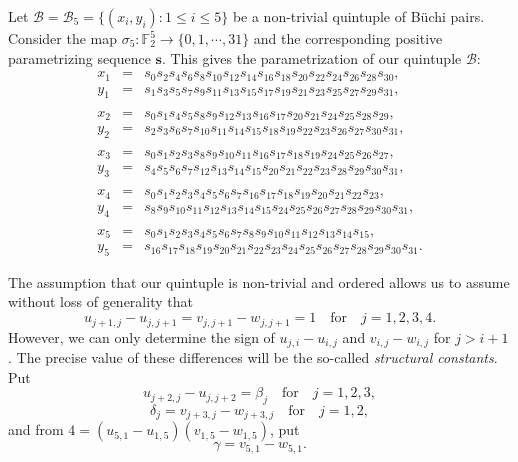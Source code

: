 \documentclass[letterpaper,10pt]{amsart}
\newcommand{\bF}{{\mathbb{F}}}
\newcommand{\Bs}{{\mathbf{s}}}
\newcommand{\B}{{\mathcal{B}}}
\theoremstyle{definition}
\numberwithin{equation}{section}
\begin{document}
Let $\B = \B_5 = \{(x_i, y_i) : 1 \leq i \leq 5\}$ be a non-trivial quintuple of B\"{u}chi pairs. Consider the map $\sigma_5 : \bF_2^{5} \rightarrow \{0, 1, \cdots, 31\}$ and the corresponding positive parametrizing sequence $\Bs$. This gives the parametrization of our quintuple $\B$:
\begin{equation} \label{quin} 
\begin{matrix} x_1 & = & s_0 s_2 s_4 s_6 s_8 s_{10} s_{12} s_{14} s_{16} s_{18} s_{20} s_{22} s_{24} s_{26} s_{28} s_{30}, \\
y_1 & = & s_1 s_3 s_5 s_7 s_9 s_{11} s_{13} s_{15} s_{17} s_{19} s_{21} s_{23} s_{25} s_{27} s_{29} s_{31}, \\ \\
x_2 & = & s_0 s_1 s_4 s_5 s_8 s_9 s_{12} s_{13} s_{16} s_{17} s_{20} s_{21} s_{24} s_{25} s_{28} s_{29}, \\
y_2 & = & s_2 s_3 s_6 s_7 s_{10} s_{11} s_{14} s_{15} s_{18} s_{19} s_{22} s_{23} s_{26} s_{27} s_{30} s_{31}, \\ \\ 
x_3 & = & s_0 s_1 s_2 s_3 s_8 s_9 s_{10} s_{11} s_{16} s_{17} s_{18} s_{19} s_{24} s_{25} s_{26} s_{27}, \\
y_3 & = & s_4 s_5 s_6 s_7 s_{12} s_{13} s_{14} s_{15} s_{20} s_{21} s_{22} s_{23} s_{28} s_{29} s_{30} s_{31}, \\ \\
x_4 & = & s_0 s_1 s_2 s_3 s_4 s_5 s_6 s_7 s_{16} s_{17} s_{18} s_{19} s_{20} s_{21} s_{22} s_{23}, \\
y_4 & = & s_8 s_9 s_{10} s_{11} s_{12} s_{13} s_{14} s_{15} s_{24} s_{25} s_{26} s_{27} s_{28} s_{29} s_{30} s_{31}, \\ \\
x_5 & = & s_0 s_1 s_2 s_3 s_4 s_5 s_6 s_7 s_8 s_9 s_{10} s_{11} s_{12} s_{13} s_{14} s_{15}, \\
y_5 & = & s_{16} s_{17} s_{18} s_{19} s_{20} s_{21} s_{22} s_{23} s_{24} s_{25} s_{26} s_{27} s_{28} s_{29} s_{30} s_{31}. 
\end{matrix}
\end{equation}

The assumption that our quintuple is non-trivial and ordered allows us to assume without loss of generality that 
\begin{equation} \label{con1} u_{j+1, j} - u_{j, j+1} = v_{j,j+1} - w_{j,j+1} = 1 \quad \text{for} \quad j = 1,2,3,4.
\end{equation}
However, we can only determine the sign of $u_{j,i} - u_{i,j}$ and $v_{i,j} - w_{i,j}$ for $j > i + 1$. The precise value of these differences will be the so-called \emph{structural constants}. Put
\begin{equation} \label{con2} u_{j+2, j} - u_{j,j+2} = \beta_j  \quad \text{for} \quad j = 1,2,3,
\end{equation}
\begin{equation} \label{con3} \delta_j = v_{j+3, j} - w_{j+3,j}  \quad \text{for} \quad j = 1,2,
\end{equation}
and from $4 = (u_{5,1} - u_{1,5})(v_{1,5} - w_{1,5})$, put
\begin{equation} \label{gamma}  
\gamma = v_{5,1} - w_{5,1}. 
\end{equation}
\end{document}

